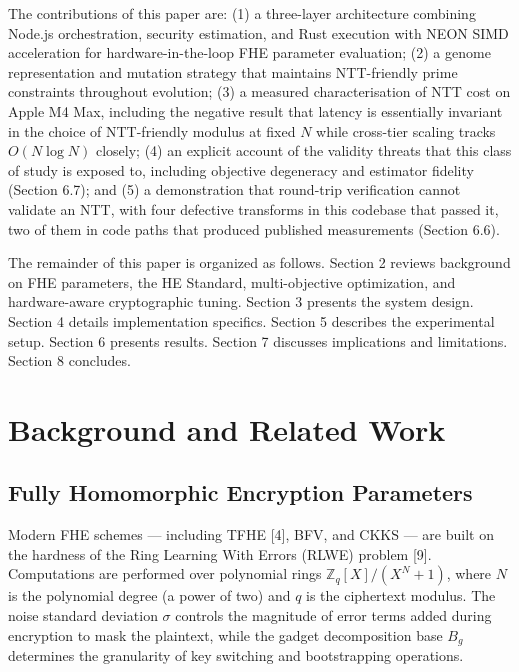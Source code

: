 The contributions of this paper are: (1) a three-layer architecture combining Node.js orchestration, security estimation, and Rust execution with NEON SIMD acceleration for hardware-in-the-loop FHE parameter evaluation; (2) a genome representation and mutation strategy that maintains NTT-friendly prime constraints throughout evolution; (3) a measured characterisation of NTT cost on Apple M4 Max, including the negative result that latency is essentially invariant in the choice of NTT-friendly modulus at fixed \(N\) while cross-tier scaling tracks \(O(N \log N)\) closely; (4) an explicit account of the validity threats that this class of study is exposed to, including objective degeneracy and estimator fidelity (Section 6.7); and (5) a demonstration that round-trip verification cannot validate an NTT, with four defective transforms in this codebase that passed it, two of them in code paths that produced published measurements (Section 6.6).

The remainder of this paper is organized as follows. Section 2 reviews background on FHE parameters, the HE Standard, multi-objective optimization, and hardware-aware cryptographic tuning. Section 3 presents the system design. Section 4 details implementation specifics. Section 5 describes the experimental setup. Section 6 presents results. Section 7 discusses implications and limitations. Section 8 concludes.

\section{Background and Related Work}\label{background-and-related-work}

\subsection{Fully Homomorphic Encryption Parameters}\label{fully-homomorphic-encryption-parameters}

Modern FHE schemes --- including TFHE [4], BFV, and CKKS --- are built on the hardness of the Ring Learning With Errors (RLWE) problem [9]. Computations are performed over polynomial rings \(\mathbb{Z}_q[X]/(X^N + 1)\), where \(N\) is the polynomial degree (a power of two) and \(q\) is the ciphertext modulus. The noise standard deviation \(\sigma\) controls the magnitude of error terms added during encryption to mask the plaintext, while the gadget decomposition base \(B_g\) determines the granularity of key switching and bootstrapping operations.

